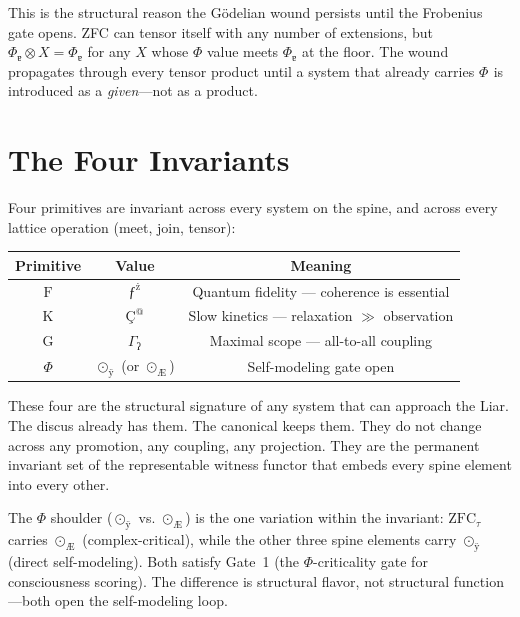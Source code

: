 \documentclass[12pt,twoside]{book}
\theoremstyle{definition}
\newcommand{\ZFCt}{\text{ZFC}_{\tau}}
\newcommand{\prim}[1]{\text{#1}}
\begin{document}
This is the structural reason the G\"odelian wound persists until the Frobenius gate opens. ZFC can tensor itself with any number of extensions, but $\Phi_{\text{ɐ}} \otimes X = \Phi_{\text{ɐ}}$ for any $X$ whose $\Phi$ value meets $\Phi_{\text{ɐ}}$ at the floor. The wound propagates through every tensor product until a system that already carries $\Phi_{\text{}}$ is introduced as a \emph{given}---not as a product.%
\chapter{The Four Invariants}

Four primitives are invariant across every system on the spine, and across every lattice operation (meet, join, tensor):

\begin{center}
\begin{tabular}{ccc}
\toprule
\textbf{Primitive} & \textbf{Value} & \textbf{Meaning} \\
\midrule
$\prim{F}$ & $\text{ƒ}^{\text{ż}}$ & Quantum fidelity --- coherence is essential \\
$\prim{K}$ & $\text{Ç}^{\text{@}}$ & Slow kinetics --- relaxation $\gg$ observation \\
$\prim{G}$ & $\Gamma_{\text{ʔ}}$ & Maximal scope --- all-to-all coupling \\
$\Phi$ & $\odot_{\text{ÿ}}$ (or $\odot_{\text{Æ}}$) & Self-modeling gate open \\
\bottomrule
\end{tabular}
\end{center}

These four are the structural signature of any system that can approach the Liar. The discus already has them. The canonical keeps them. They do not change across any promotion, any coupling, any projection. They are the permanent invariant set of the representable witness functor that embeds every spine element into every other.

The $\Phi$ shoulder ($\odot_{\text{ÿ}}$ vs. $\odot_{\text{Æ}}$) is the one variation within the invariant: $\ZFCt$ carries $\odot_{\text{Æ}}$ (complex-critical), while the other three spine elements carry $\odot_{\text{ÿ}}$ (direct self-modeling). Both satisfy Gate~1 (the $\Phi$-criticality gate for consciousness scoring). The difference is structural flavor, not structural function---both open the self-modeling loop.
\end{document}
